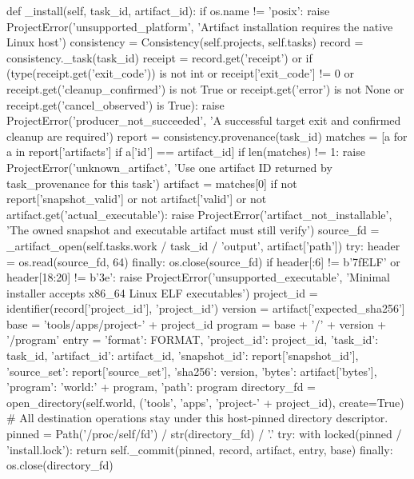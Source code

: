     def _install(self, task_id, artifact_id):
        if os.name != 'posix':
            raise ProjectError('unsupported_platform', 'Artifact installation requires the native Linux host')
        consistency = Consistency(self.projects, self.tasks)
        record = consistency._task(task_id)
        receipt = record.get('receipt') or {}
        if (type(receipt.get('exit_code')) is not int or receipt['exit_code'] != 0
                or receipt.get('cleanup_confirmed') is not True or receipt.get('error') is not None
                or receipt.get('cancel_observed') is True):
            raise ProjectError('producer_not_succeeded', 'A successful target exit and confirmed cleanup are required')
        report = consistency.provenance(task_id)
        matches = [a for a in report['artifacts'] if a['id'] == artifact_id]
        if len(matches) != 1:
            raise ProjectError('unknown_artifact', 'Use one artifact ID returned by task_provenance for this task')
        artifact = matches[0]
        if not report['snapshot_valid'] or not artifact['valid'] or not artifact.get('actual_executable'):
            raise ProjectError('artifact_not_installable', 'The owned snapshot and executable artifact must still verify')
        source_fd = _artifact_open(self.tasks.work / task_id / 'output', artifact['path'])
        try:
            header = os.read(source_fd, 64)
        finally:
            os.close(source_fd)
        if header[:6] != b'\x7fELF' or header[18:20] != b'\x3e':
            raise ProjectError('unsupported_executable', 'Minimal installer accepts x86_64 Linux ELF executables')
        project_id = identifier(record['project_id'], 'project_id')
        version = artifact['expected_sha256']
        base = 'tools/apps/project-' + project_id
        program = base + '/' + version + '/program'
        entry = {'format': FORMAT, 'project_id': project_id, 'task_id': task_id,
                 'artifact_id': artifact_id, 'snapshot_id': report['snapshot_id'],
                 'source_set': report['source_set'], 'sha256': version, 'bytes': artifact['bytes'],
                 'program': 'world:' + program, 'path': program}
        directory_fd = open_directory(self.world, ('tools', 'apps', 'project-' + project_id), create=True)
        # All destination operations stay under this host-pinned directory descriptor.
        pinned = Path('/proc/self/fd') / str(directory_fd) / '.'
        try:
            with locked(pinned / 'install.lock'):
                return self._commit(pinned, record, artifact, entry, base)
        finally:
            os.close(directory_fd)

